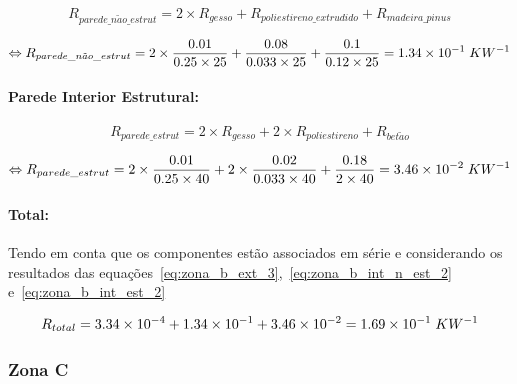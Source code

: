 \documentclass[12pt, a4paper]{article}
\begin{document}
\begin{equation}
	R_{parede\_n\tilde{a}o\_estrut} = 2 \times R_{gesso} + R_{poliestireno\_extrudido} + R_{madeira\_pinus}
	\label{eq:zona_b_int_n_est_1}
\end{equation}

\begin{equation}
	\Leftrightarrow R_{parede\_n\tilde{a}o\_estrut} =
	2 \times \dfrac{0.01}{0.25 \times 25} +
	\dfrac{0.08}{0.033 \times 25} +
	\dfrac{0.1}{0.12 \times 25} = 1.34 \times 10^{-1} \hspace{1mm} KW^{-1}
	\label{eq:zona_b_int_n_est_2}
\end{equation}

\paragraph{Parede Interior Estrutural:}\label{par:zona_b_int_est}

\begin{equation}
	R_{parede\_estrut} = 2 \times R_{gesso} + 2 \times R_{poliestireno} + R_{bet\tilde{a}o}
	\label{eq:zona_b_int_est_1}
\end{equation}

\begin{equation}
	\Leftrightarrow R_{parede\_estrut} =
		2 \times \dfrac{0.01}{0.25 \times 40} +
		2 \times \dfrac{0.02}{0.033 \times 40} +
		\dfrac{0.18}{2 \times 40}
		= 3.46 \times 10^{-2} \hspace{1mm} KW^{-1}
	\label{eq:zona_b_int_est_2}
\end{equation}


\paragraph{Total:}\label{par:zona_b_total} Tendo em conta que os componentes est\~ao
associados em série e considerando os resultados das
equa\c{c}\~oes~\ref*{eq:zona_b_ext_3},~\ref*{eq:zona_b_int_n_est_2} e~\ref*{eq:zona_b_int_est_2}

\begin{equation}
	R_{total} =
		3.34 \times 10^{-4} + 1.34 \times 10^{-1} + 3.46 \times 10^{-2} = 1.69 \times 10^{-1} \hspace{1mm} KW^{-1}
	\label{eq:zona_b_total}
\end{equation}


\subsubsection{Zona C}\label{ssub:Zona C}
\end{document}
